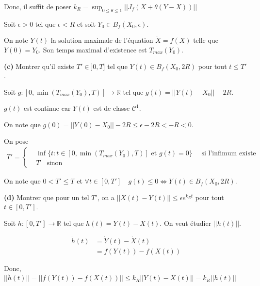 \documentclass[french]{article}
\begin{document}
	Donc, il suffit de poser $k_R = \sup_{0\leq \theta \leq 1} || J_f(X + \theta(Y - X)) ||$

	\begin{tcolorbox}[colback=red!5!white,colframe=red!75!black]
		Soit $\epsilon > 0$ tel que $\epsilon < R$ et soit $Y_0 \in B_f(X_0, \epsilon)$.
		
		On note $Y(t)$ la solution maximale de l'équation $\dot{X} = f(X)$ telle que $Y(0) = Y_0$. Son temps maximal d'existence est $T_{max}(Y_0)$.
	\end{tcolorbox}

	\begin{tcolorbox}[colback=gray!5!white,colframe=gray!75!black]
		\textbf{\large{(c)}} Montrer qu'il existe $T' \in ]0, T]$ tel que $Y(t) \in B_f(X_0, 2R)$ pour tout $t \leq T'$.
	\end{tcolorbox}

	Soit $g: [0, \min(T_{max}(Y_0), T)] \to \mathbb{R}$ tel que  $g(t) = || Y(t) - X_0 || - 2R$.
	
	$g(t)$ est continue car $Y(t)$ est de classe $\mathcal{C}^1$.
	
	On note que $g(0) = ||Y(0) - X_0|| - 2R \leq \epsilon - 2R < -R < 0$.
	
	On pose
	\begin{align}
	T' = 
		\begin{cases}
			&\inf \{ t : t \in [0, \min(T_{max}(Y_0), T)] \text{ et } g(t) = 0 \} \quad \text{ si l'infimum existe }\\
			&T \quad \text{sinon}
		\end{cases}
	\end{align}
	
	On note que $0 < T' \leq T$ et  $\forall t \in [0, T'] \quad g(t) \leq 0 \iff Y(t) \in B_f(X_0, 2R)$.
	
	\begin{tcolorbox}[colback=gray!5!white,colframe=gray!75!black]
		\textbf{\large{(d)}} Montrer que pour un tel $T'$, on a $|| X(t) - Y(t) || \leq \epsilon e^{k_Rt}$ pour tout $t \in [0, T']$.
	\end{tcolorbox}

	Soit $h : [0, T'] \to \mathbb{R}$ tel que $h(t) = Y(t) - X(t)$. On veut étudier $||h(t)||$.

	\begin{align}
		\dot{h}(t) &= \dot{Y}(t) - \dot{X}(t)\\
						 &= f(Y(t)) - f(X(t))
	\end{align}
	
	Donc, $||\dot{h}(t)|| = ||f(Y(t)) - f(X(t))|| \leq k_R ||Y(t) - X(t)|| = k_R||h(t)||$
	
\end{document}

